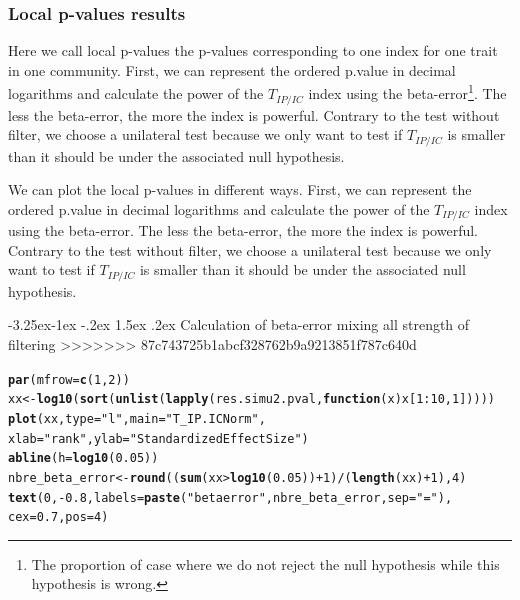 \documentclass[12pt]{article}\usepackage[]{graphicx}\usepackage[]{color}
\makeatletter
\newcommand{\hlnum}[1]{\textcolor[rgb]{0.686,0.059,0.569}{#1}}%
\newcommand{\hlstr}[1]{\textcolor[rgb]{0.192,0.494,0.8}{#1}}%
\newcommand{\hlopt}[1]{\textcolor[rgb]{0,0,0}{#1}}%
\newcommand{\hlstd}[1]{\textcolor[rgb]{0.345,0.345,0.345}{#1}}%
\newcommand{\hlkwa}[1]{\textcolor[rgb]{0.161,0.373,0.58}{\textbf{#1}}}%
\newcommand{\hlkwb}[1]{\textcolor[rgb]{0.69,0.353,0.396}{#1}}%
\newcommand{\hlkwc}[1]{\textcolor[rgb]{0.333,0.667,0.333}{#1}}%
\newcommand{\hlkwd}[1]{\textcolor[rgb]{0.737,0.353,0.396}{\textbf{#1}}}%
\newenvironment{kframe}{%
 \def\at@end@of@kframe{}%
 \ifinner\ifhmode%
  \def\at@end@of@kframe{\end{minipage}}%
  \begin{minipage}{\columnwidth}%
 \fi\fi%
 \def\FrameCommand##1{\hskip\@totalleftmargin \hskip-\fboxsep
 \colorbox{shadecolor}{##1}\hskip-\fboxsep
     \hskip-\linewidth \hskip-\@totalleftmargin \hskip\columnwidth}%
 \MakeFramed {\advance\hsize-\width
   \@totalleftmargin\z@ \linewidth\hsize
   \@setminipage}}%
 {\par\unskip\endMakeFramed%
 \at@end@of@kframe}
\newenvironment{knitrout}{}{} %
\newcounter {subsubsubsection}[subsubsection]
\newcommand\subsubsubsection{\@startsection{subsubsubsection}{4}{\z@}%
          {-3.25ex\@plus -1ex \@minus -.2ex}%
          {1.5ex \@plus .2ex}%
          {\normalfont\normalsize\bfseries}}
\makeatother
\begin{document}
\begin{landscape}
 \subsubsection {Local p-values results}

Here we call local p-values the p-values corresponding to one index for one trait in one community. First, we can represent the ordered p.value in decimal logarithms and calculate the power of the $T_{IP/IC}$ index using the beta-error\footnote{The proportion of case where we do not reject the null hypothesis while this hypothesis is wrong.}. The less the beta-error, the more the index is powerful. Contrary to the test without filter, we choose a unilateral test because we only want to test if $T_{IP/IC}$ is smaller than it should be under the associated null hypothesis.

We can plot the local p-values in different ways. First, we can represent the ordered p.value in decimal logarithms and calculate the power of the $T_{IP/IC}$ index using the beta-error. The less the beta-error, the more the index is powerful. Contrary to the test without filter, we choose a unilateral test because we only want to test if $T_{IP/IC}$ is smaller than it should be under the associated null hypothesis.

  \subsubsubsection {Calculation of beta-error mixing all strength of filtering}
>>>>>>> 87c743725b1abcf328762b9a9213851f787c640d
 
\begin{knitrout}\small
{}\color{fgcolor}\begin{kframe}
\begin{alltt}
\hlkwd{par}\hlstd{(}\hlkwc{mfrow} \hlstd{=} \hlkwd{c}\hlstd{(}\hlnum{1}\hlstd{,} \hlnum{2}\hlstd{))}
\hlstd{xx} \hlkwb{<-} \hlkwd{log10}\hlstd{(}\hlkwd{sort}\hlstd{(}\hlkwd{unlist}\hlstd{(}\hlkwd{lapply}\hlstd{(res.simu2.pval,} \hlkwa{function}\hlstd{(}\hlkwc{x}\hlstd{) x[}\hlnum{1}\hlopt{:}\hlnum{10}\hlstd{,} \hlnum{1}\hlstd{]))))}
\hlkwd{plot}\hlstd{(xx,} \hlkwc{type} \hlstd{=} \hlstr{"l"}\hlstd{,} \hlkwc{main} \hlstd{=} \hlstr{"T_IP.IC Norm"}\hlstd{,}
     \hlkwc{xlab} \hlstd{=} \hlstr{"rank"}\hlstd{,} \hlkwc{ylab} \hlstd{=} \hlstr{"Standardized Effect Size"}\hlstd{)}
\hlkwd{abline}\hlstd{(}\hlkwc{h} \hlstd{=} \hlkwd{log10}\hlstd{(}\hlnum{0.05}\hlstd{))}
\hlstd{nbre_beta_error} \hlkwb{<-} \hlkwd{round}\hlstd{((}\hlkwd{sum}\hlstd{(xx}\hlopt{>}\hlkwd{log10}\hlstd{(}\hlnum{0.05}\hlstd{))}\hlopt{+}\hlnum{1}\hlstd{)}\hlopt{/}\hlstd{(}\hlkwd{length}\hlstd{(xx)}\hlopt{+}\hlnum{1}\hlstd{),} \hlnum{4}\hlstd{)}
\hlkwd{text}\hlstd{(}\hlnum{0}\hlstd{,} \hlopt{-}\hlnum{0.8}\hlstd{,} \hlkwc{labels} \hlstd{=} \hlkwd{paste}\hlstd{(}\hlstr{"beta error"}\hlstd{, nbre_beta_error,} \hlkwc{sep} \hlstd{=} \hlstr{" = "}\hlstd{),}
  \hlkwc{cex} \hlstd{=} \hlnum{0.7}\hlstd{,} \hlkwc{pos} \hlstd{=} \hlnum{4}\hlstd{)}


\end{alltt}
\end{kframe}
\end{knitrout}
\end{landscape}
\end{document}
